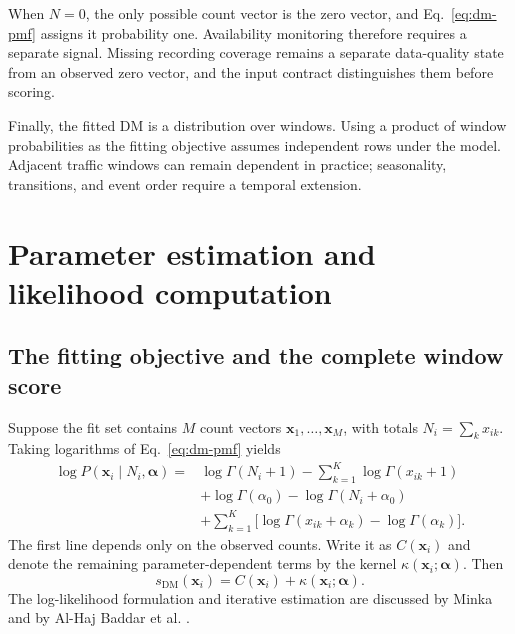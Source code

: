 When $N=0$, the only possible count vector is the zero vector, and
Eq.~\eqref{eq:dm-pmf} assigns it probability one. Availability monitoring
therefore requires a separate signal. Missing recording coverage remains a
separate data-quality state from an observed zero vector, and the input
contract distinguishes them before scoring.

Finally, the fitted DM is a distribution over windows. Using a product of
window probabilities as the fitting objective assumes independent rows
under the model. Adjacent traffic
windows can remain dependent in practice; seasonality, transitions, and
event order require a temporal extension.

\section{Parameter estimation and likelihood computation}
\label{sec:background-estimation}

\subsection{The fitting objective and the complete window score}

Suppose the fit set contains $M$ count vectors
$\boldsymbol{x}_1,\ldots,\boldsymbol{x}_M$, with totals
$N_i=\sum_k x_{ik}$. Taking logarithms of Eq.~\eqref{eq:dm-pmf} yields
\begin{equation}
\begin{split}
  \log P(\boldsymbol{x}_i\mid N_i,\boldsymbol{\alpha})
  ={}&\log\Gamma(N_i+1)-\sum_{k=1}^{K}\log\Gamma(x_{ik}+1)\\
     &+\log\Gamma(\alpha_0)-\log\Gamma(N_i+\alpha_0)\\
     &+\sum_{k=1}^{K}
       \bigl[\log\Gamma(x_{ik}+\alpha_k)-\log\Gamma(\alpha_k)\bigr].
\end{split}
\label{eq:dm-log-score}
\end{equation}
The first line depends only on the observed counts. Write it as
$C(\boldsymbol{x}_i)$ and denote the remaining parameter-dependent terms
by the kernel $\kappa(\boldsymbol{x}_i;\boldsymbol{\alpha})$. Then
\begin{equation}
  s_{\mathrm{DM}}(\boldsymbol{x}_i)
  =C(\boldsymbol{x}_i)+
    \kappa(\boldsymbol{x}_i;\boldsymbol{\alpha}).
\label{eq:kernel-and-score}
\end{equation}
The log-likelihood formulation and iterative estimation are discussed by
Minka and by Al-Haj Baddar et al.
\cite{minka2000,alhajbaddar2025analysis}.

